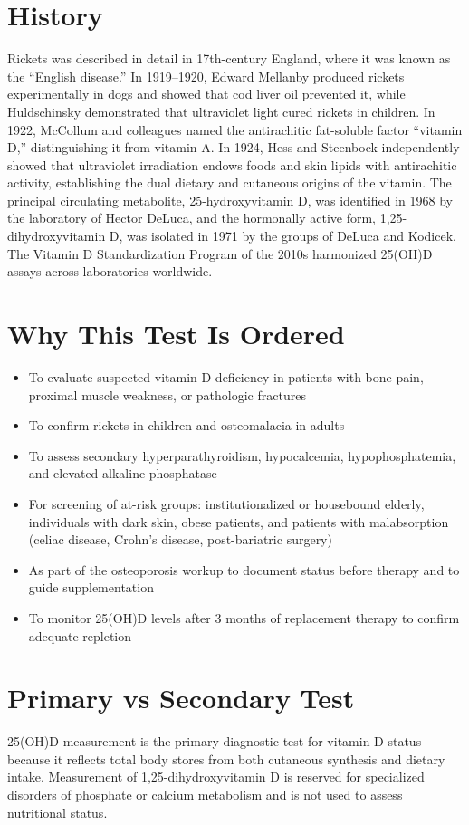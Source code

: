 \section*{History}
Rickets was described in detail in 17th-century England, where it was known as the ``English disease.'' In 1919--1920, Edward Mellanby produced rickets experimentally in dogs and showed that cod liver oil prevented it, while Huldschinsky demonstrated that ultraviolet light cured rickets in children. In 1922, McCollum and colleagues named the antirachitic fat-soluble factor ``vitamin D,'' distinguishing it from vitamin A. In 1924, Hess and Steenbock independently showed that ultraviolet irradiation endows foods and skin lipids with antirachitic activity, establishing the dual dietary and cutaneous origins of the vitamin. The principal circulating metabolite, 25-hydroxyvitamin D, was identified in 1968 by the laboratory of Hector DeLuca, and the hormonally active form, 1,25-dihydroxyvitamin D, was isolated in 1971 by the groups of DeLuca and Kodicek. The Vitamin D Standardization Program of the 2010s harmonized 25(OH)D assays across laboratories worldwide.
\section*{Why This Test Is Ordered}
\begin{itemize}
  \item To evaluate suspected vitamin D deficiency in patients with bone pain, proximal muscle weakness, or pathologic fractures
  \item To confirm rickets in children and osteomalacia in adults
  \item To assess secondary hyperparathyroidism, hypocalcemia, hypophosphatemia, and elevated alkaline phosphatase
  \item For screening of at-risk groups: institutionalized or housebound elderly, individuals with dark skin, obese patients, and patients with malabsorption (celiac disease, Crohn's disease, post-bariatric surgery)
  \item As part of the osteoporosis workup to document status before therapy and to guide supplementation
  \item To monitor 25(OH)D levels after 3 months of replacement therapy to confirm adequate repletion
\end{itemize}
\section*{Primary vs Secondary Test}
25(OH)D measurement is the primary diagnostic test for vitamin D status because it reflects total body stores from both cutaneous synthesis and dietary intake. Measurement of 1,25-dihydroxyvitamin D is reserved for specialized disorders of phosphate or calcium metabolism and is not used to assess nutritional status.
